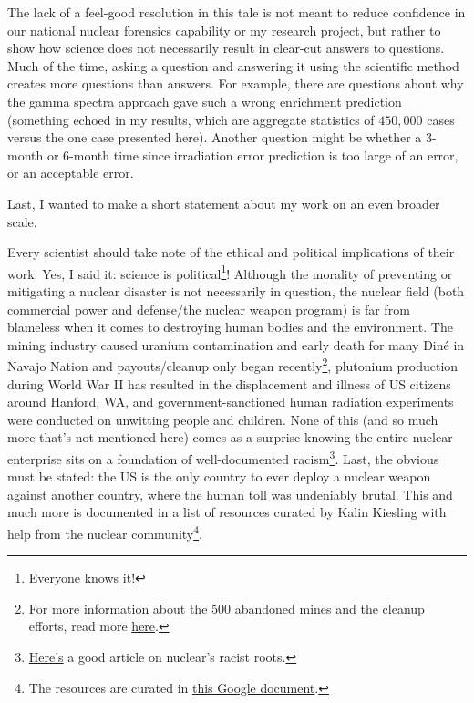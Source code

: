 {The lack of a feel-good resolution in this tale is not meant to reduce
confidence in our national nuclear forensics capability or my research project,
but rather to show how science does not necessarily result in clear-cut answers
to questions. Much of the time, asking a question and answering it using the
scientific method creates more questions than answers. For example,  there are
questions about why the gamma spectra approach gave such a wrong enrichment
prediction (something echoed in my results, which are aggregate statistics of
$450,000$ cases versus the one case presented here). Another question might be
whether a 3-month or 6-month time since irradiation error prediction is too
large of an error, or an acceptable error.

Last, I wanted to make a short statement about my work on an even broader
scale.

Every scientist should take note of the ethical and political implications of
their work. Yes, I said it: science is political\footnote[8]{Everyone knows
\href{https://www.scientificamerican.com/article/yes-science-is-political/}{\color{blue}it}!}!
Although the morality of preventing or mitigating a nuclear disaster is not
necessarily in question, the nuclear field (both commercial power and
defense/the nuclear weapon program) is far from blameless when it comes to
destroying human bodies and the environment. The mining industry caused uranium
contamination and early death for many Din\'{e} in Navajo Nation and
payouts/cleanup only began recently\footnote[9]{For more information about the 500
abandoned mines and the cleanup efforts, read more
\href{https://www.epa.gov/navajo-nation-uranium-cleanup/abandoned-mines-cleanup}{\color{blue}here}.},
plutonium production during World War II has resulted in the displacement and
illness of US citizens around Hanford, WA, and government-sanctioned human
radiation experiments were conducted on unwitting people and children. None of
this (and so much more that's not mentioned here) comes as a surprise knowing
the entire nuclear enterprise sits on a foundation of well-documented
racism\footnote[10]{\href{https://thebulletin.org/2020/08/a-call-for-antiracist-action-and-accountability-in-the-us-nuclear-community/}{\color{blue}Here's}
a good article on nuclear's racist roots.}.  Last, the obvious must be stated:
the US is the only country to ever deploy a nuclear weapon against another
country, where the human toll was undeniably brutal. This and much more is
documented in a list of resources curated by Kalin Kiesling with help from the
nuclear community\footnote[11]{The resources are curated in
\href{https://docs.google.com/document/d/e/2PACX-1vQuRSix5J31G4yhH-Z0kwmlpXe6OgS9MXg6l-LBEOVNDPDAPVivPSrJ7A71TMCsW2EdvGMepZCcwdTP/pub}{\color{blue}this
Google document}.}.

}
